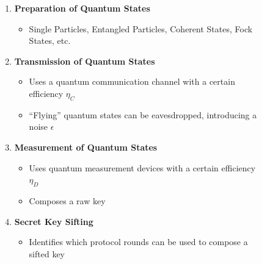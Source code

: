 \documentclass{beamer}
\begin{document}
\begin{frame}
\begin{figure}
\begin{minipage}{0.4\textwidth}
                    \caption{\color{blue}{Figure 2: }\color{black}{Flowchart of a QKD protocol}}
                    \label{fig:qkd-protocol-flowchart-1}
                \end{minipage}%
                \hspace{0.05\textwidth}%
                \begin{minipage}{0.55\textwidth}
                    \begin{enumerate}\footnotesize
                        \item \textbf{Preparation of Quantum States}
                        \begin{itemize}\scriptsize
                            \item Single Particles, Entangled Particles, Coherent States, Fock States, etc.
                        \end{itemize}
                        \item \textbf{Transmission of Quantum States}
                        \begin{itemize}\scriptsize
                            \item Uses a quantum communication channel with a certain efficiency ${\eta}_{C}$
                            \item ``Flying'' quantum states can be eavesdropped, introducing a noise $\epsilon$
                        \end{itemize}
                        \item \textbf{Measurement of Quantum States}
                        \begin{itemize}\scriptsize
                            \item Uses quantum measurement devices with a certain efficiency ${\eta}_{D}$
                            \item Composes a raw key
                        \end{itemize}
                        \item \textbf{Secret Key Sifting}
                        \begin{itemize}\scriptsize
                            \item Identifies which protocol rounds can be used to compose a sifted key
                        \end{itemize}
                    \end{enumerate}
                \end{minipage}
            \end{figure}
   
		\end{frame}
  
\end{document}
